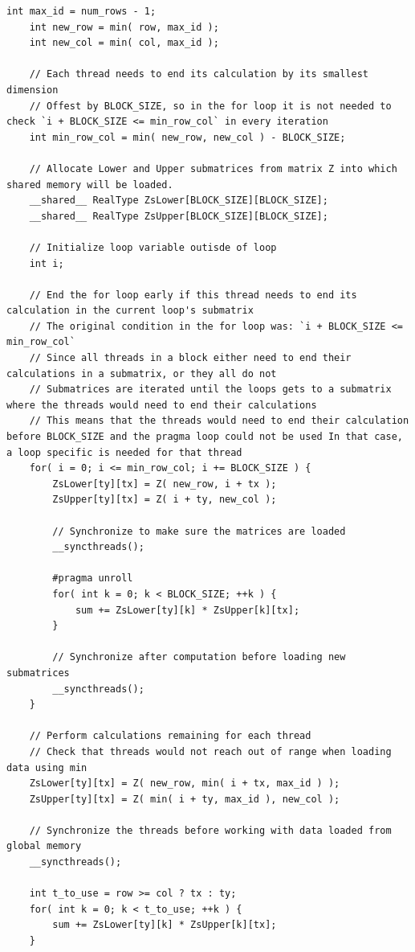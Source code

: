\begin{lstlisting}[caption={Core of the decomposition kernel with the inefficient conditions replaced by a combinated of the \code{min()} function and helpful variables. Taken from the Decomposition project repository on GitLab\protect\footref{Footnote:decomposition-project-gitlab-url}.},label={Listing:implementation-optimization-elimination-of-conditions},escapechar=@]
	int max_id = num_rows - 1;
	int new_row = min( row, max_id );
	int new_col = min( col, max_id );
	
	// Each thread needs to end its calculation by its smallest dimension
	// Offest by BLOCK_SIZE, so in the for loop it is not needed to check `i + BLOCK_SIZE <= min_row_col` in every iteration
	int min_row_col = min( new_row, new_col ) - BLOCK_SIZE;
	
	// Allocate Lower and Upper submatrices from matrix Z into which shared memory will be loaded.
	__shared__ RealType ZsLower[BLOCK_SIZE][BLOCK_SIZE];
	__shared__ RealType ZsUpper[BLOCK_SIZE][BLOCK_SIZE];
	
	// Initialize loop variable outisde of loop
	int i;
	
	// End the for loop early if this thread needs to end its calculation in the current loop's submatrix
	// The original condition in the for loop was: `i + BLOCK_SIZE <= min_row_col`
	// Since all threads in a block either need to end their calculations in a submatrix, or they all do not
	// Submatrices are iterated until the loops gets to a submatrix where the threads would need to end their calculations
	// This means that the threads would need to end their calculation before BLOCK_SIZE and the pragma loop could not be used In that case, a loop specific is needed for that thread
	for( i = 0; i <= min_row_col; i += BLOCK_SIZE ) {
		ZsLower[ty][tx] = Z( new_row, i + tx );
		ZsUpper[ty][tx] = Z( i + ty, new_col );
		
		// Synchronize to make sure the matrices are loaded
		__syncthreads();
		
		#pragma unroll
		for( int k = 0; k < BLOCK_SIZE; ++k ) {
			sum += ZsLower[ty][k] * ZsUpper[k][tx];
		}
		
		// Synchronize after computation before loading new submatrices
		__syncthreads();
	}
	
	// Perform calculations remaining for each thread
	// Check that threads would not reach out of range when loading data using min
	ZsLower[ty][tx] = Z( new_row, min( i + tx, max_id ) );
	ZsUpper[ty][tx] = Z( min( i + ty, max_id ), new_col );
	
	// Synchronize the threads before working with data loaded from global memory
	__syncthreads();
	
	int t_to_use = row >= col ? tx : ty;
	for( int k = 0; k < t_to_use; ++k ) {
		sum += ZsLower[ty][k] * ZsUpper[k][tx];
	}
\end{lstlisting}

